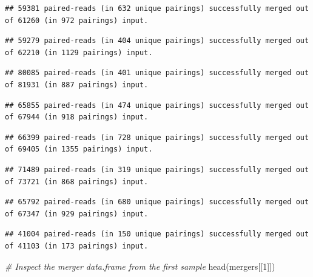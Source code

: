 \documentclass[
]{article}
\newenvironment{Shaded}{\begin{snugshade}}{\end{snugshade}}
\newcommand{\CommentTok}[1]{\textcolor[rgb]{0.56,0.35,0.01}{\textit{#1}}}
\newcommand{\DecValTok}[1]{\textcolor[rgb]{0.00,0.00,0.81}{#1}}
\newcommand{\FunctionTok}[1]{\textcolor[rgb]{0.00,0.00,0.00}{#1}}
\newcommand{\NormalTok}[1]{#1}
\begin{document}
\begin{verbatim}
## 59381 paired-reads (in 632 unique pairings) successfully merged out of 61260 (in 972 pairings) input.
\end{verbatim}

\begin{verbatim}
## 59279 paired-reads (in 404 unique pairings) successfully merged out of 62210 (in 1129 pairings) input.
\end{verbatim}

\begin{verbatim}
## 80085 paired-reads (in 401 unique pairings) successfully merged out of 81931 (in 887 pairings) input.
\end{verbatim}

\begin{verbatim}
## 65855 paired-reads (in 474 unique pairings) successfully merged out of 67944 (in 918 pairings) input.
\end{verbatim}

\begin{verbatim}
## 66399 paired-reads (in 728 unique pairings) successfully merged out of 69405 (in 1355 pairings) input.
\end{verbatim}

\begin{verbatim}
## 71489 paired-reads (in 319 unique pairings) successfully merged out of 73721 (in 868 pairings) input.
\end{verbatim}

\begin{verbatim}
## 65792 paired-reads (in 680 unique pairings) successfully merged out of 67347 (in 929 pairings) input.
\end{verbatim}

\begin{verbatim}
## 41004 paired-reads (in 150 unique pairings) successfully merged out of 41103 (in 173 pairings) input.
\end{verbatim}

\begin{Shaded}
\begin{Highlighting}[]
\CommentTok{\# Inspect the merger data.frame from the first sample}
\FunctionTok{head}\NormalTok{(mergers[[}\DecValTok{1}\NormalTok{]])}
\end{Highlighting}
\end{Shaded}
\end{document}
